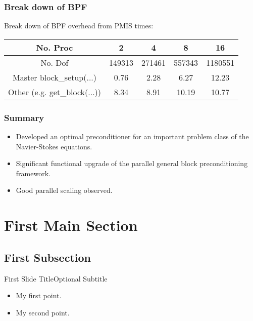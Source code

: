 \documentclass{beamer}
\begin{document}
\begin{frame}\frametitle{Break down of BPF}

 Break down of BPF overhead from PMIS times:
\begin{center}
  \begin{tabular}{| c | c | c | c | c|}
    \hline
    No. Proc      &    2  &  4     & 8     & 16  \\ \hline
    No. Dof       &149313 &271461  &557343 &1180551 \\ \hline
    Master block\_setup(...)  &0.76   &2.28    &6.27   &12.23 \\ \hline
    Other  (e.g. get\_block(...))    &8.34   &8.91    &10.19  &10.77 \\
    \hline
    \end{tabular}
\end{center}
\end{frame}
\begin{frame}\frametitle{Summary}
  \begin{itemize}
\item Developed an optimal preconditioner for an important problem class of the Navier-Stokes equations.
\item Significant functional upgrade of the parallel general block preconditioning framework.
\item Good parallel scaling observed.
\end{itemize}
\end{frame}







\section{First Main Section}

\subsection{First Subsection}

\begin{frame}{First Slide Title}{Optional Subtitle}
  \begin{itemize}
  \item {
    My first point.
  }
  \item {
    My second point.
  }
  \end{itemize}
\end{frame}
\end{document}
